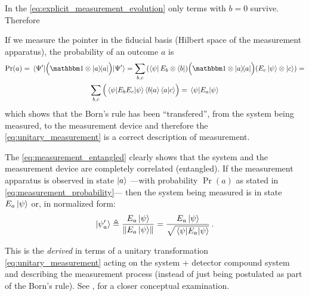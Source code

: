 
In the \ref{eq:explicit_measurement_evolution} only terms with $b=0$ survive.
Therefore

If we measure the pointer in the fiducial basis
(Hilbert space of the measurement apparatus),
the probability of an outcome $a$ is
\begin{multline}\label{eq:measurement_probability}
  \Pr(a) = \expval{\qty\Big(\idop\ox\ketbra{a})}{\Psi^{\prime}} =
    \sum_{b,c}
      \qty(\bra{\psi}E_{b}\ox\bra{b})
      \qty\Big(\idop\ox\ketbra{a})
      \qty(E_{c}\ket{\psi}\ox\ket{c}) = \\
    \sum_{b,c}\qty\Big(\expval{E_bE_c}{\psi} \braket{b}{a} \braket{a}{c}) =
    \expval{E_a}{\psi}
\end{multline}
which shows that the Born's rule has been ``transfered'', from the system being
measured, to the measurement device and therefore the
\eqref{eq:unitary_measurement} is a correct description of measurement.

The \eqref{eq:measurement_entangled} clearly shows that the system
and the measurement device are completely correlated (entangled).
If the measurement apparatus is observed in state $\ket{a}$
---with probability $\Pr(a)$ as stated in \eqref{eq:measurement_probability}---
then the system being measured is in state $E_{a}\ket{\psi}$
or, in normalized form:
\begin{equation}\label{eq:normalized_collapse}
  \ket{\psi^\prime_a} \triangleq \frac{E_{a}\ket{\psi}}{\norm{E_{a}\ket{\psi}}}
    = \frac{E_{a}\ket{\psi}}{\sqrt{\expval{E_a}{\psi}}} \,\text{.}
\end{equation}

This is the  \emph{derived} in terms of a unitary
transformation \eqref{eq:unitary_measurement}
acting on the system + detector compound system and describing
the measurement process
(instead of just being postulated as part of the Born's rule).
See \cite[sec. 2.5.4, \emph{Decoherence models versus Copenhagen interpretation}]{Haroche_Exploring},
for a closer conceptual examination.

